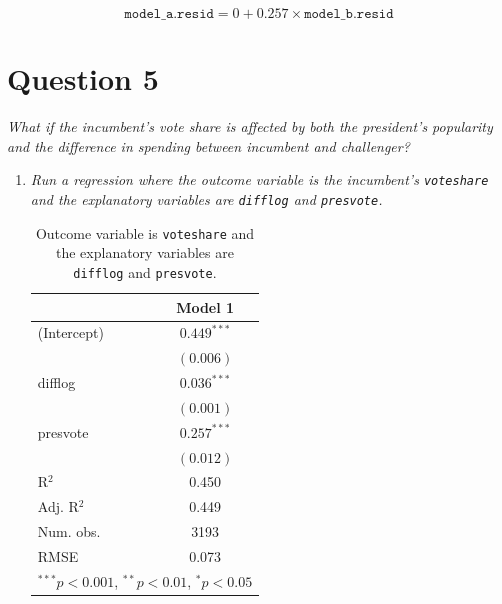 \documentclass[12pt,letterpaper]{article}
\begin{document}
\begin{enumerate}
		
		\begin{equation*}
		\texttt{model\_a.resid} =  0 + 0.257 \times \texttt{model\_b.resid}
		\end{equation*}
	\end{enumerate}\vspace{.25cm}
	
	\section*{Question 5}
	\noindent \emph{What if the incumbent's vote share is affected by both the president's popularity and the difference in spending between incumbent and challenger? }
	\begin{enumerate}
		\item \emph{Run a regression where the outcome variable is the incumbent's \texttt{voteshare} and the explanatory variables are \texttt{difflog} and \texttt{presvote}.}	\vspace{.25cm}
		
				  
				
					
				\begin{table}[h!]
					\begin{center}
						\caption{\footnotesize{Outcome variable is \texttt{voteshare} and the explanatory variables are  \texttt{difflog} and \texttt{presvote}.}} 
						
						\begin{tabular}{l c }
							\hline
							& Model 1 \\
							\hline		
						(Intercept) & $0.449^{***}$ \\
            & $(0.006)$     \\
difflog     & $0.036^{***}$ \\
            & $(0.001)$     \\
presvote    & $0.257^{***}$ \\
            & $(0.012)$     \\
\hline
R$^2$       & 0.450         \\
Adj. R$^2$  & 0.449         \\
Num. obs.   & 3193          \\
RMSE        & 0.073         \\
							\hline
							\multicolumn{2}{l}{\scriptsize{$^{***}p<0.001$, $^{**}p<0.01$, $^*p<0.05$}}
						\end{tabular}
						
					\end{center}
				\end{table}
				

\end{enumerate}
\end{document}
